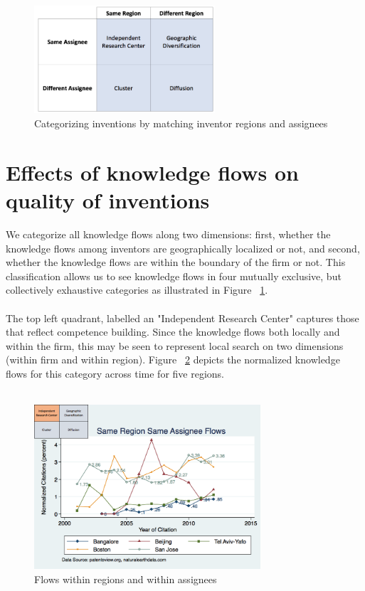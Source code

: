 \documentclass[12pt]{article}
\begin{document}
\begin{figure}[h]
\begin{centering}
  \includegraphics[width=0.6\textwidth]{2x2}
  \caption{Categorizing inventions by matching inventor regions and assignees}
  \label{fig:2x2}
\end{centering}
\end{figure}

\section*{Effects of knowledge flows on quality of inventions}
We categorize all knowledge flows along two dimensions:  first, whether the knowledge flows among inventors are geographically localized or not, and second, whether the knowledge flows are within the boundary of the firm or not. This classification allows us to see knowledge flows in four mutually exclusive, but collectively exhaustive categories as illustrated in Figure ~\ref{fig:2x2}. 
\\\\
The top left quadrant, labelled an "Independent Research Center" captures those that reflect competence building. Since the knowledge flows both locally and within the firm, this may be seen to represent local search on two dimensions (within firm and within region).  Figure ~\ref{fig:SMSSameRegionSameAssigneeFlows} depicts the normalized knowledge flows for this category across time for five regions. 
\\\\
\begin{figure}[h!]
\begin{centering}
  \includegraphics[width=0.75\textwidth]{SMSSameRegionSameAssigneeFlows}
  \caption{Flows within regions and within assignees}
  \label{fig:SMSSameRegionSameAssigneeFlows}
\end{centering}
\end{figure}
\end{document}
